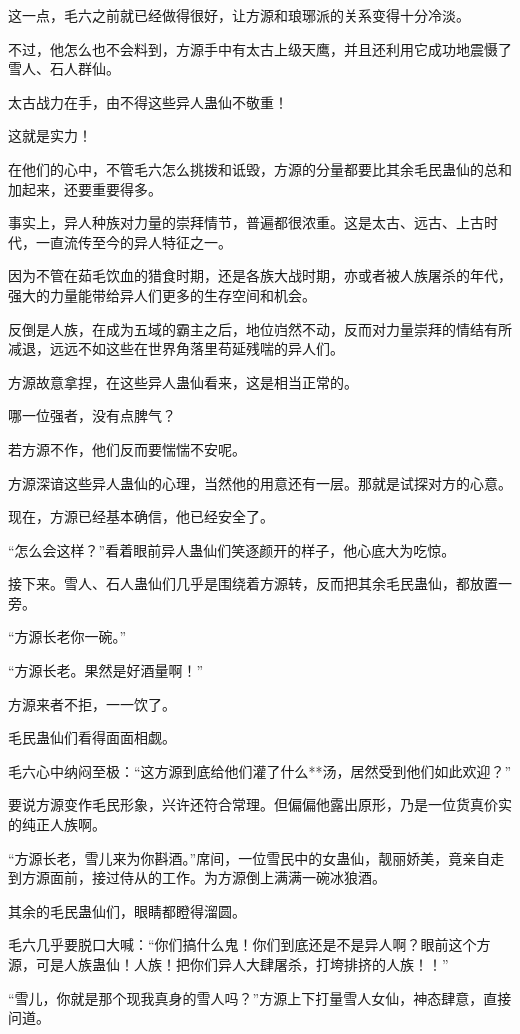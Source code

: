 \begin{this_body}
这一点，毛六之前就已经做得很好，让方源和琅琊派的关系变得十分冷淡。

不过，他怎么也不会料到，方源手中有太古上级天鹰，并且还利用它成功地震慑了雪人、石人群仙。

太古战力在手，由不得这些异人蛊仙不敬重！

这就是实力！

在他们的心中，不管毛六怎么挑拨和诋毁，方源的分量都要比其余毛民蛊仙的总和加起来，还要重要得多。

事实上，异人种族对力量的崇拜情节，普遍都很浓重。这是太古、远古、上古时代，一直流传至今的异人特征之一。

因为不管在茹毛饮血的猎食时期，还是各族大战时期，亦或者被人族屠杀的年代，强大的力量能带给异人们更多的生存空间和机会。

反倒是人族，在成为五域的霸主之后，地位岿然不动，反而对力量崇拜的情结有所减退，远远不如这些在世界角落里苟延残喘的异人们。

方源故意拿捏，在这些异人蛊仙看来，这是相当正常的。

哪一位强者，没有点脾气？

若方源不作，他们反而要惴惴不安呢。

方源深谙这些异人蛊仙的心理，当然他的用意还有一层。那就是试探对方的心意。

现在，方源已经基本确信，他已经安全了。

“怎么会这样？”看着眼前异人蛊仙们笑逐颜开的样子，他心底大为吃惊。

接下来。雪人、石人蛊仙们几乎是围绕着方源转，反而把其余毛民蛊仙，都放置一旁。

“方源长老你一碗。”

“方源长老。果然是好酒量啊！”

方源来者不拒，一一饮了。

毛民蛊仙们看得面面相觑。

毛六心中纳闷至极：“这方源到底给他们灌了什么**汤，居然受到他们如此欢迎？”

要说方源变作毛民形象，兴许还符合常理。但偏偏他露出原形，乃是一位货真价实的纯正人族啊。

“方源长老，雪儿来为你斟酒。”席间，一位雪民中的女蛊仙，靓丽娇美，竟亲自走到方源面前，接过侍从的工作。为方源倒上满满一碗冰狼酒。

其余的毛民蛊仙们，眼睛都瞪得溜圆。

毛六几乎要脱口大喊：“你们搞什么鬼！你们到底还是不是异人啊？眼前这个方源，可是人族蛊仙！人族！把你们异人大肆屠杀，打垮排挤的人族！！”

“雪儿，你就是那个现我真身的雪人吗？”方源上下打量雪人女仙，神态肆意，直接问道。


\end{this_body}
